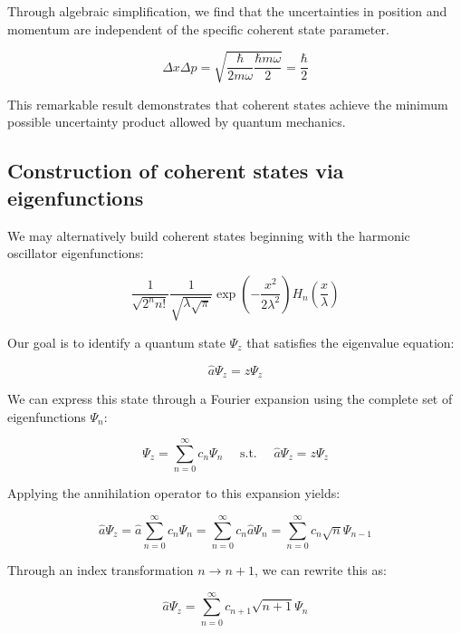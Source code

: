 \documentclass[italian]{HKNdocument}
\begin{document}
Through algebraic simplification, we find that the uncertainties in position and momentum are independent of the specific coherent state parameter.

\begin{equation}
\Delta x \Delta p=\sqrt{\frac{\hbar}{2 m \omega} \frac{\hbar m \omega}{2}}=\frac{\hbar}{2}
\end{equation}

This remarkable result demonstrates that coherent states achieve the minimum possible uncertainty product allowed by quantum mechanics.

\subsection{Construction of coherent states via eigenfunctions}
We may alternatively build coherent states beginning with the harmonic oscillator eigenfunctions:

\begin{equation}
\frac{1}{\sqrt{2^{n} n!}} \frac{1}{\sqrt{\lambda \sqrt{\pi}}} \exp \left(-\frac{x^{2}}{2 \lambda^{2}}\right) H_{n}\left(\frac{x}{\lambda}\right)
\end{equation}

Our goal is to identify a quantum state $\Psi_{z}$ that satisfies the eigenvalue equation:

\begin{equation}
\hat{a} \Psi_{z}=z \Psi_{z}
\end{equation}

We can express this state through a Fourier expansion using the complete set of eigenfunctions $\Psi_{n}$:

\begin{equation}
\Psi_{z}=\sum_{n=0}^{\infty} c_{n} \Psi_{n} \quad \text { s.t. } \quad \hat{a} \Psi_{z}=z \Psi_{z}
\end{equation}

Applying the annihilation operator to this expansion yields:

\begin{equation}
\hat{a} \Psi_{z}=\hat{a} \sum_{n=0}^{\infty} c_{n} \Psi_{n}=\sum_{n=0}^{\infty} c_{n} \hat{a} \Psi_{n}=\sum_{n=0}^{\infty} c_{n} \sqrt{n} \Psi_{n-1}
\end{equation}

Through an index transformation $n \rightarrow n+1$, we can rewrite this as:

\begin{equation}
\hat{a} \Psi_{z}=\sum_{n=0}^{\infty} c_{n+1} \sqrt{n+1} \Psi_{n}
\end{equation}
\end{document}
